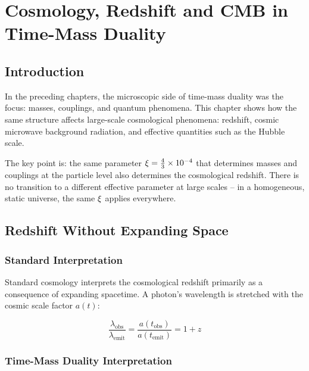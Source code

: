 
\chapter{Cosmology, Redshift and CMB in Time-Mass Duality}

\section{Introduction}

In the preceding chapters, the microscopic side of time-mass duality was the 
focus: masses, couplings, and quantum phenomena. This chapter shows how the 
same structure affects large-scale cosmological phenomena: redshift, cosmic 
microwave background radiation, and effective quantities such as the Hubble scale.

The key point is: the same parameter $\xi = \frac{4}{3} \times 10^{-4}$ 
that determines masses and couplings at the particle level also determines 
the cosmological redshift. There is no transition to a different effective 
parameter at large scales -- in a homogeneous, static universe, the same 
$\xi$ applies everywhere.

\section{Redshift Without Expanding Space}

\subsection{Standard Interpretation}

Standard cosmology interprets the cosmological redshift primarily as a 
consequence of expanding spacetime. A photon's wavelength is stretched 
with the cosmic scale factor $a(t)$:

\begin{equation}
\frac{\lambda_{\text{obs}}}{\lambda_{\text{emit}}} = \frac{a(t_{\text{obs}})}{a(t_{\text{emit}})} = 1 + z
\end{equation}

\subsection{Time-Mass Duality Interpretation}


